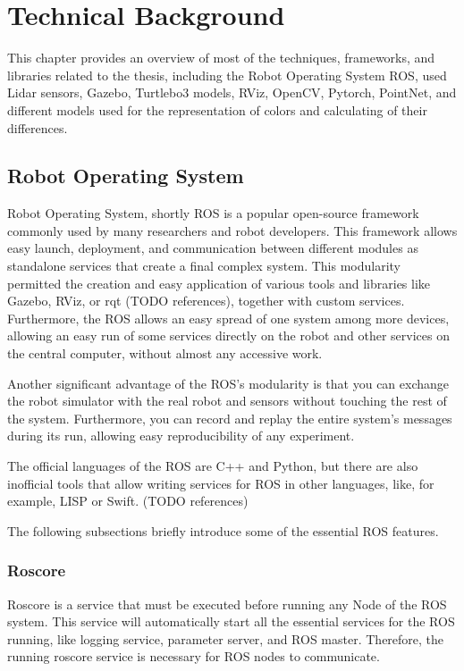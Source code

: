 \chapter{Technical Background}\label{chapter:technicalBackground}

This chapter provides an overview of most of the techniques, frameworks, and libraries related to the thesis, including the Robot Operating System ROS, used Lidar sensors, Gazebo, Turtlebo3 models, RViz, OpenCV, Pytorch, PointNet, and different models used for the representation of colors and calculating of their differences.

\section{Robot Operating System}\label{section:ROS}

Robot Operating System, shortly ROS is a popular open-source framework commonly used by many researchers and robot developers. This framework allows easy launch, deployment, and communication between different modules as standalone services that create a final complex system. This modularity permitted the creation and easy application of various tools and libraries like Gazebo, RViz, or rqt (TODO references), together with custom services. Furthermore, the ROS allows an easy spread of one system among more devices, allowing an easy run of some services directly on the robot and other services on the central computer, without almost any accessive work.\par
Another significant advantage of the ROS's modularity is that you can exchange the robot simulator with the real robot and sensors without touching the rest of the system. Furthermore, you can record and replay the entire system's messages during its run, allowing easy reproducibility of any experiment.\par
The official languages of the ROS are C++ and Python, but there are also inofficial tools that allow writing services for ROS in other languages, like, for example, LISP or Swift. (TODO references)\par
The following subsections briefly introduce some of the essential ROS features.

\subsection*{Roscore}

Roscore is a service that must be executed before running any Node of the ROS system. This service will automatically start all the essential services for the ROS running, like logging service, parameter server, and ROS master. Therefore, the running roscore service is necessary for ROS nodes to communicate.

